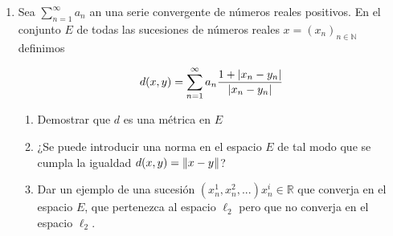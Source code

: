 \documentclass[12pt]{article}
\newcommand{\subscript}[2]{$#1 _ #2$}
\newcommand\N{\ensuremath{\mathbb{N}}}
\newcommand\R{\ensuremath{\mathbb{R}}}
\begin{document}
\begin{enumerate}[label=\textbf{\arabic*}.]
\begin{proof}
\begin{enumerate}[label=(\subscript{N}{{\arabic*}})]
\item $\forall \: (x_1,...,x_n) \in \R^n$ arbitrario s.t.q. $\abs{{x}_{i}} \geqslant 0 \: \forall \: i = 1,...,n$
\begin{equation*}
    {\norm{x}}_{1} = \sum\limits_{i=1}^{n} \abs{{x}_{i}}  \geqslant 0 
\end{equation*}
\item 
\begin{equation*}
    {\norm{x}}_{1} = 0 \Leftrightarrow  \sum\limits_{i=1}^{n} \abs{{x}_{i}} = 0 \Leftrightarrow {x}_{i} = 0 \: \forall \: i = 1,...n
\end{equation*}
\item Sea $x= (x_1,...,x_n) \in \R^n$ y $\lambda \in \R$
\begin{equation*}
    {\norm{\lambda x}}_{1} = \sum\limits_{i=1}^{n} \abs{\lambda {x}_{i}} = \sum\limits_{i=1}^{n} \abs{\lambda} \abs{{x}_{i}} = \abs{\lambda} \sum\limits_{i=1}^{n}  \abs{{x}_{i}} = \abs{\lambda}{\norm{ x}}_{1}
\end{equation*}
\item  Sea $x= (x_1,...,x_n), y= (y_1,...,y_n) \in \R^n$
\begin{equation*}
    {\norm{x+y}}_{1} = \sum\limits_{i=1}^{n}  \abs{{x}_{i}+{y}_{i}} \leqslant \sum\limits_{i=1}^{n}  \left( \abs{{x}_{i}} + \abs{{y}_{i}} \right) = \sum\limits_{i=1}^{n}  \abs{{x}_{i}} + \sum\limits_{i=1}^{n}  \abs{{y}_{i}} = {\norm{x}}_{1} + {\norm{y}}_{1}
\end{equation*}
\end{enumerate}
$\therefore {\norm{x}}_{1}$ es una norma en $\R^n$
\end{proof}

\item Sea $\sum_{n=1}^{\infty} a_n$ an una serie convergente de números reales positivos. En el conjunto $E$ de todas las sucesiones de números reales $x ={(x_n)}_{n \in \N} $ definimos

\begin{equation*}
    d(x,y) = \sum_{n=1}^{\infty} a_n \frac{1+ \abs{x_n-y_n}}{\abs{x_n-y_n}}
\end{equation*}

\begin{enumerate}
    \item Demostrar que $d$ es una métrica en $E$
    \item ¿Se puede introducir una norma en el espacio $E$ de tal modo que se cumpla la igualdad $d(x,y) = \norm{x-y}$?
    \item Dar un ejemplo de una sucesión $({x}_{n}^{1},{x}_{n}^{2},...){x}_{n}^{i} \in \R$ que converja en el espacio $E$, que pertenezca al espacio $\ell_2$ pero que no converja en el espacio $\ell_2$.
\end{enumerate}


\end{enumerate}
\end{document}
